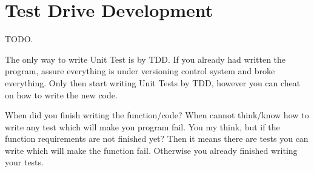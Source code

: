     \section{Test Drive Development}

    TODO.

    The only way to write Unit Test is by TDD.
    If you already had written the program,
    assure everything is under versioning control system and broke everything.
    Only then start writing Unit Tests by TDD,
    however you can cheat on how to write the new code.

    When did you finish writing the function/code? When cannot think/know how to write
    any test which will make you program fail.
    You my think,
    but if the function requirements are not finished yet? Then it means there are
    tests you can write which will make the function fail.
    Otherwise you already finished writing your tests.



